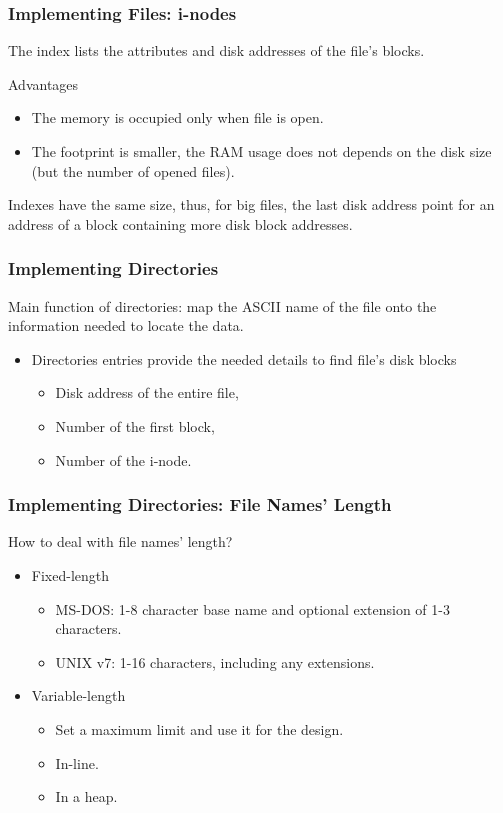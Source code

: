 \begin{frame}
    \frametitle{Implementing Files: i-nodes}
    The index lists the attributes and disk addresses of the file's blocks.
    \begin{block}{Advantages}
        \begin{itemize}
            \item The memory is occupied only when file is open.
            \item The footprint is smaller, the RAM usage does not depends on the disk size (but the number of opened files).
        \end{itemize}
    \end{block}
    Indexes have the same size, thus, for big files, the last disk address point for an address of a block containing more disk block addresses.
\end{frame}

\begin{frame}
    \frametitle{Implementing Directories}
    Main function of directories: map the ASCII name of the file onto the information needed to locate the data.
    \begin{itemize}
        \item Directories entries provide the needed details to find file's disk blocks
            \begin{itemize}
                \item Disk address of the entire file,
                \item Number of the first block,
                \item Number of the i-node.
            \end{itemize}
    \end{itemize}
\end{frame}

\begin{frame}
    \frametitle{Implementing Directories: File Names' Length}
    How to deal with file names' length?
    \begin{itemize}
        \item Fixed-length
        \begin{itemize}
            \item MS-DOS: 1-8 character base name and optional extension of 1-3 characters.
            \item UNIX v7: 1-16 characters, including any extensions.
        \end{itemize}
        \item Variable-length
        \begin{itemize}
            \item Set a maximum limit and use it for the design.
            \item In-line.
            \item In a heap.
        \end{itemize}
    \end{itemize}
\end{frame}

